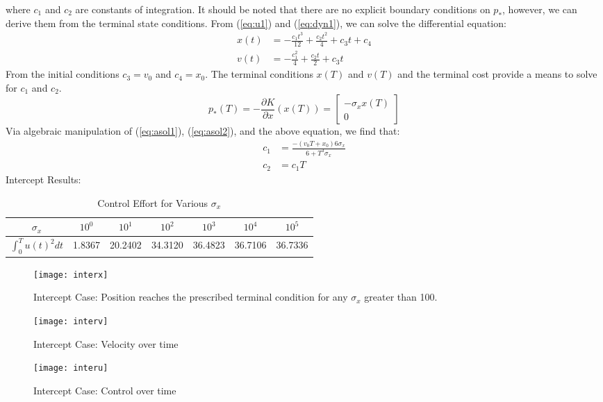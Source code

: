 \documentclass{article}
\begin{document}
where $c_1$ and $c_2$ are constants of integration. It should be noted that there are no explicit boundary conditions on $p_*$, however, we can derive them from the terminal state conditions. From (\ref{eq:u1}) and (\ref{eq:dyn1}), we can solve the differential equation:
\begin{align}
	x(t) &= -\frac{c_1t^3}{12} + \frac{c_2t^2}{4} + c_3t + c_4 \label{eq:asol1} \\
	v(t) &= -\frac{c_1^2}{4} + \frac{c_2t}{2} + c_3t \label{eq:asol2}
\end{align}
From the initial conditions $c_3 = v_0$ and $c_4 = x_0$. \newline
The terminal conditions $x(T)$ and $v(T)$ and the terminal cost provide a means to solve for $c_1$ and $c_2$.
\begin{equation*}
	p_*(T) = -\frac{\partial K}{\partial x}(x(T)) = \begin{bmatrix} -\sigma_x x(T) \\ 0 \end{bmatrix}
\end{equation*}
Via algebraic manipulation of (\ref{eq:asol1}), (\ref{eq:asol2}), and the above equation, we find that:
\begin{align*}
	c_1 &= \frac{-(v_0T + x_0)6\sigma_x}{6 + T^3\sigma_x} \\
	c_2 &= c_1T
\end{align*}
\newpage
Intercept Results:
\newline
\begin{table}[H]
	\centering
	\caption{Control Effort for Various $\sigma_x$}
	\begin{tabular}{c | c c c c c c}
		$\sigma_x$ & $10^0$ & $10^1$ & $10^2$ & $10^3$ & $10^4$ & $10^5$ \\
		\hline
		$\int_0^T{u(t)^2 dt}$ & 1.8367 & 20.2402 & 34.3120 & 36.4823 & 36.7106 & 36.7336
	\end{tabular}
\end{table}
\begin{figure}[H]
	\centering
	\texttt{[image: interx]}
	\caption{Intercept Case: Position reaches the prescribed terminal condition for any $\sigma_x$ greater than 100.}
\end{figure}
\begin{figure}[H]
	\centering
	\texttt{[image: interv]}
	\caption{Intercept Case: Velocity over time}
\end{figure}
\begin{figure}[H]
	\centering
	\texttt{[image: interu]}
	\caption{Intercept Case: Control over time}
\end{figure}
\end{document}
